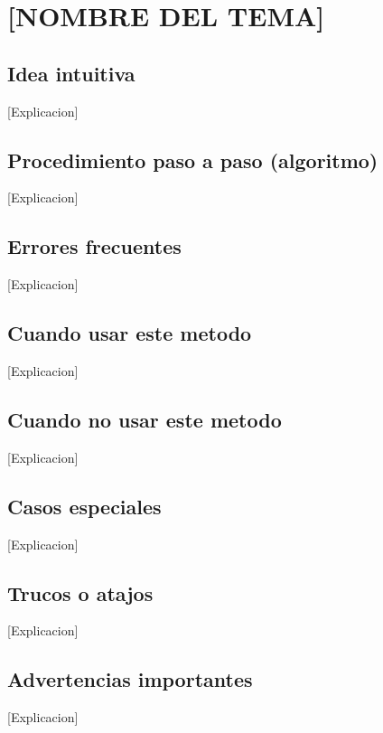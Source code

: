 \documentclass{article}
\begin{document}
\large

\section*{[NOMBRE DEL TEMA]}

\subsection*{Idea intuitiva}
[Explicacion]

\subsection*{Procedimiento paso a paso (algoritmo)}
[Explicacion]

\subsection*{Errores frecuentes}
[Explicacion]

\subsection*{Cuando usar este metodo}
[Explicacion]

\subsection*{Cuando no usar este metodo}
[Explicacion]

\subsection*{Casos especiales}
[Explicacion]

\subsection*{Trucos o atajos}
[Explicacion]

\subsection*{Advertencias importantes}
[Explicacion]
\end{document}
